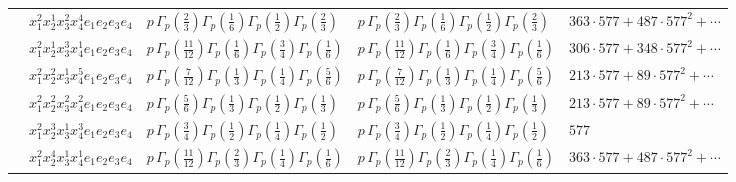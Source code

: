 \documentclass[11pt]{article}
\begin{document}
\begin{table}[ht]
{\begin{tabular}{@{}lllll@{}}
 & $x_{1}^{2} x_{2}^{1} x_{3}^{2} x_{4}^{4}  e_{1} e_{2} e_{3} e_{4}$ & $p \, \Gamma_p \left( \frac{2}{3} \right) \Gamma_p \left( \frac{1}{6} \right) \Gamma_p \left( \frac{1}{2} \right) \Gamma_p \left( \frac{2}{3} \right)$ & $p \, \Gamma_p \left( \frac{2}{3} \right) \Gamma_p \left( \frac{1}{6} \right) \Gamma_p \left( \frac{1}{2} \right) \Gamma_p \left( \frac{2}{3} \right)$ & $363{\cdot}577{+}487{\cdot}577^{2}{+}\cdots$ \\
 & $x_{1}^{2} x_{2}^{1} x_{3}^{3} x_{4}^{1}  e_{1} e_{2} e_{3} e_{4}$ & $p \, \Gamma_p \left( \frac{11}{12} \right) \Gamma_p \left( \frac{1}{6} \right) \Gamma_p \left( \frac{3}{4} \right) \Gamma_p \left( \frac{1}{6} \right)$ & $p \, \Gamma_p \left( \frac{11}{12} \right) \Gamma_p \left( \frac{1}{6} \right) \Gamma_p \left( \frac{3}{4} \right) \Gamma_p \left( \frac{1}{6} \right)$ & $306{\cdot}577{+}348{\cdot}577^{2}{+}\cdots$ \\
 & $x_{1}^{2} x_{2}^{2} x_{3}^{1} x_{4}^{5}  e_{1} e_{2} e_{3} e_{4}$ & $p \, \Gamma_p \left( \frac{7}{12} \right) \Gamma_p \left( \frac{1}{3} \right) \Gamma_p \left( \frac{1}{4} \right) \Gamma_p \left( \frac{5}{6} \right)$ & $p \, \Gamma_p \left( \frac{7}{12} \right) \Gamma_p \left( \frac{1}{3} \right) \Gamma_p \left( \frac{1}{4} \right) \Gamma_p \left( \frac{5}{6} \right)$ & $213{\cdot}577{+}89{\cdot}577^{2}{+}\cdots$ \\
 & $x_{1}^{2} x_{2}^{2} x_{3}^{2} x_{4}^{2}  e_{1} e_{2} e_{3} e_{4}$ & $p \, \Gamma_p \left( \frac{5}{6} \right) \Gamma_p \left( \frac{1}{3} \right) \Gamma_p \left( \frac{1}{2} \right) \Gamma_p \left( \frac{1}{3} \right)$ & $p \, \Gamma_p \left( \frac{5}{6} \right) \Gamma_p \left( \frac{1}{3} \right) \Gamma_p \left( \frac{1}{2} \right) \Gamma_p \left( \frac{1}{3} \right)$ & $213{\cdot}577{+}89{\cdot}577^{2}{+}\cdots$ \\
 & $x_{1}^{2} x_{2}^{3} x_{3}^{1} x_{4}^{3}  e_{1} e_{2} e_{3} e_{4}$ & $p \, \Gamma_p \left( \frac{3}{4} \right) \Gamma_p \left( \frac{1}{2} \right) \Gamma_p \left( \frac{1}{4} \right) \Gamma_p \left( \frac{1}{2} \right)$ & $p \, \Gamma_p \left( \frac{3}{4} \right) \Gamma_p \left( \frac{1}{2} \right) \Gamma_p \left( \frac{1}{4} \right) \Gamma_p \left( \frac{1}{2} \right)$ & $577$ \\
 & $x_{1}^{2} x_{2}^{4} x_{3}^{1} x_{4}^{1}  e_{1} e_{2} e_{3} e_{4}$ & $p \, \Gamma_p \left( \frac{11}{12} \right) \Gamma_p \left( \frac{2}{3} \right) \Gamma_p \left( \frac{1}{4} \right) \Gamma_p \left( \frac{1}{6} \right)$ & $p \, \Gamma_p \left( \frac{11}{12} \right) \Gamma_p \left( \frac{2}{3} \right) \Gamma_p \left( \frac{1}{4} \right) \Gamma_p \left( \frac{1}{6} \right)$ & $363{\cdot}577{+}487{\cdot}577^{2}{+}\cdots$ \\

\end{tabular}}
\end{table}
\end{document}
